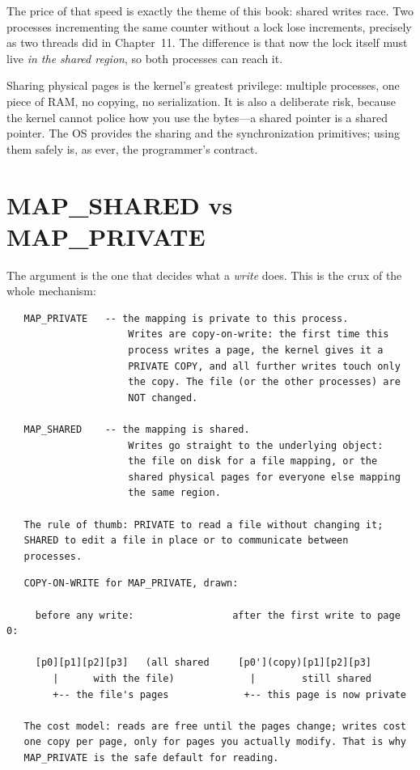 The price of that speed is exactly the theme of this book: shared
writes race. Two processes incrementing the same counter without a
lock lose increments, precisely as two threads did in Chapter~11. The
difference is that now the lock itself must live \emph{in the shared
region}, so both processes can reach it.

\begin{osconcept}
Sharing physical pages is the kernel's greatest privilege: multiple
processes, one piece of RAM, no copying, no serialization. It is also
a deliberate risk, because the kernel cannot police how you use the
bytes---a shared pointer is a shared pointer. The OS provides the
sharing and the synchronization primitives; using them safely is, as
ever, the programmer's contract.
\end{osconcept}

\section{MAP\_SHARED vs MAP\_PRIVATE}

The  argument is the one that decides what a \emph{write}
does. This is the crux of the whole mechanism:

\begin{verbatim}
   MAP_PRIVATE   -- the mapping is private to this process.
                     Writes are copy-on-write: the first time this
                     process writes a page, the kernel gives it a
                     PRIVATE COPY, and all further writes touch only
                     the copy. The file (or the other processes) are
                     NOT changed.

   MAP_SHARED    -- the mapping is shared.
                     Writes go straight to the underlying object:
                     the file on disk for a file mapping, or the
                     shared physical pages for everyone else mapping
                     the same region.

   The rule of thumb: PRIVATE to read a file without changing it;
   SHARED to edit a file in place or to communicate between
   processes.
\end{verbatim}

\begin{verbatim}
   COPY-ON-WRITE for MAP_PRIVATE, drawn:

     before any write:                 after the first write to page 0:

     [p0][p1][p2][p3]   (all shared     [p0'](copy)[p1][p2][p3]
        |      with the file)             |        still shared
        +-- the file's pages             +-- this page is now private

   The cost model: reads are free until the pages change; writes cost
   one copy per page, only for pages you actually modify. That is why
   MAP_PRIVATE is the safe default for reading.
\end{verbatim}


